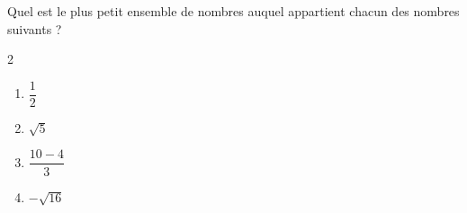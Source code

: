 \begin{exo}{}
	Quel est le plus petit ensemble de nombres auquel appartient chacun des nombres suivants ?
	\vspace*{-2mm}\begin{multicols}{2}
	\begin{enumerate}
		\item $\dfrac{1}{2}$
		\item $\sqrt{5}$
		\item $\dfrac{10 - 4}{3}$
		\item $-\sqrt{16}$
	\end{enumerate}
	\end{multicols}\vspace*{-2mm}
\end{exo}
